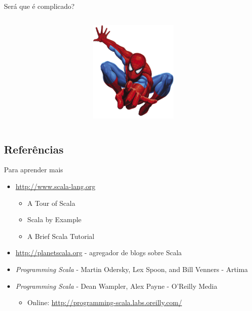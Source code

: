 \documentclass{beamer}
\begin{document}
\begin{frame}[fragile]{Será que é complicado?}
	
	\vfill
	\begin{columns}
           \begin{column}{.5\textwidth}               
           \end{column}
           \begin{column}{.5\textwidth}
               \includegraphics[height=5cm]{spiderman.png}
           \end{column}
	\end{columns}
	
\end{frame}

\subsection{Referências}

\begin{frame}{Para aprender mais}
	\begin{itemize} 
	\item \url{http://www.scala-lang.org}
		\begin{itemize} 
			\item A Tour of Scala
			\item Scala by Example
			\item A Brief Scala Tutorial
		\end{itemize}
	\item \url{http://planetscala.org} - agregador de blogs sobre Scala
	\item \emph{Programming Scala} - Martin Odersky, Lex Spoon, and Bill Venners - Artima
	\item \emph{Programming Scala} - Dean Wampler, Alex Payne - O’Reilly Media 
	\begin{itemize} 
		\item Online: \url{http://programming-scala.labs.oreilly.com/}
	\end{itemize}

	\end{itemize}
\end{frame}
\end{document}
